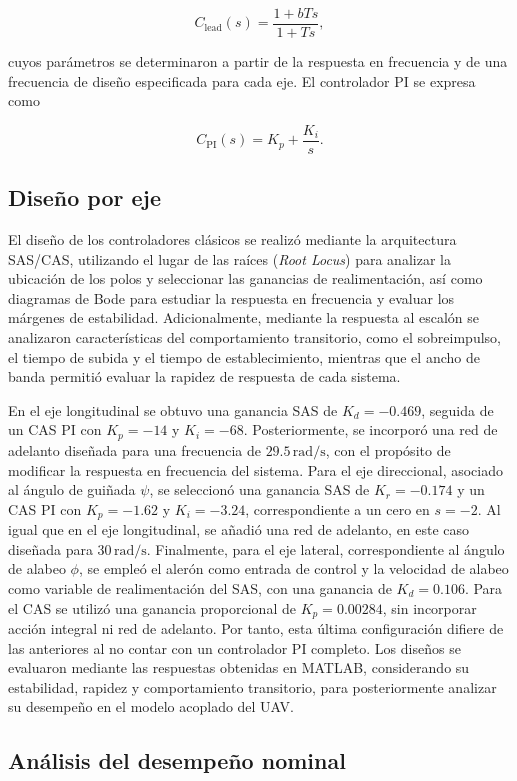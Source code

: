 \documentclass[11pt,letterpaper]{article}
\numberwithin{equation}{section}
\begin{document}
\[
C_{\mathrm{lead}}(s)=\frac{1+bTs}{1+Ts},
\]

cuyos parámetros se determinaron a partir de la respuesta en
frecuencia y de una frecuencia de diseño especificada para cada
eje. El controlador PI se expresa como

\[
C_{\mathrm{PI}}(s)=K_p+\frac{K_i}{s}.
\]

\subsection{Diseño por eje}

El diseño de los controladores clásicos se realizó mediante la arquitectura SAS/CAS, utilizando el lugar de las raíces (\textit{Root Locus}) para analizar la ubicación de los polos y seleccionar las ganancias de realimentación, así como diagramas de Bode para estudiar la respuesta en frecuencia y evaluar los márgenes de estabilidad. Adicionalmente, mediante la respuesta al escalón se analizaron características del comportamiento transitorio, como el sobreimpulso, el tiempo de subida y el tiempo de establecimiento, mientras que el ancho de banda permitió evaluar la rapidez de respuesta de cada sistema.

En el eje longitudinal se obtuvo una ganancia SAS de $K_d=-0.469$, seguida de un CAS PI con $K_p=-14$ y $K_i=-68$. Posteriormente, se incorporó una red de adelanto diseñada para una frecuencia de $29.5\,\mathrm{rad/s}$, con el propósito de modificar la respuesta en frecuencia del sistema. Para el eje direccional, asociado al ángulo de guiñada $\psi$, se seleccionó una ganancia SAS de $K_r=-0.174$ y un CAS PI con $K_p=-1.62$ y $K_i=-3.24$, correspondiente a un cero en $s=-2$. Al igual que en el eje longitudinal, se añadió una red de adelanto, en este caso diseñada para $30\,\mathrm{rad/s}$. Finalmente, para el eje lateral, correspondiente al ángulo de alabeo $\phi$, se empleó el alerón como entrada de control y la velocidad de alabeo como variable de realimentación del SAS, con una ganancia de $K_d=0.106$. Para el CAS se utilizó una ganancia proporcional de $K_p=0.00284$, sin incorporar acción integral ni red de adelanto. Por tanto, esta última configuración difiere de las anteriores al no contar con un controlador PI completo. Los diseños se evaluaron mediante las respuestas obtenidas en MATLAB, considerando su estabilidad, rapidez y comportamiento transitorio, para posteriormente analizar su desempeño en el modelo acoplado del UAV.

\subsection{Análisis del desempeño nominal}
\end{document}
